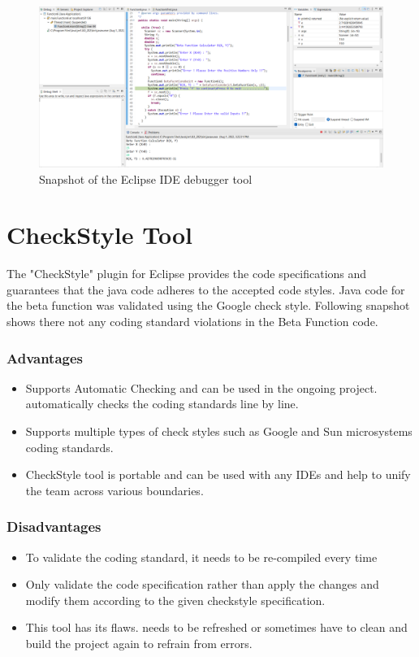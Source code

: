 \documentclass[a4paper, 12pt]{article}
\begin{document}
\begin{figure}[h]
    \centering
    \begin{center}
    \includegraphics[width=0.73\linewidth]{Images/Debugger_snapshot.png}    
    \end{center}
    \caption{Snapshot of the Eclipse IDE debugger tool }
    \label{fig:Eclipse Debugger Tool snapshot.}
\end{figure}

\newpage
\section*{CheckStyle Tool}
The "CheckStyle" plugin for Eclipse provides the code specifications and guarantees that the java code adheres to the accepted code styles. Java code for the beta function was validated using the Google check style. Following snapshot shows there not any coding standard violations in the Beta Function code.\\
\subsubsection*{Advantages}
    \begin{itemize}[noitemsep]
        \item Supports Automatic Checking and can be used in the ongoing project. automatically checks the coding standards line by line.
        \item Supports multiple types of check styles such as Google and Sun microsystems coding standards.
        \item CheckStyle tool is portable and can be used with any IDEs and help to unify the team across various boundaries.
    \end{itemize}

\subsubsection*{Disadvantages}
    \begin{itemize}[noitemsep]
        \item To validate the coding standard, it needs to be re-compiled every time
        \item Only validate the code specification rather than apply the changes and modify them according to the given checkstyle specification.
        \item This tool has its flaws. needs to be refreshed or sometimes have to clean and build the project again to refrain from errors.
    \end{itemize}
    
\end{document}
